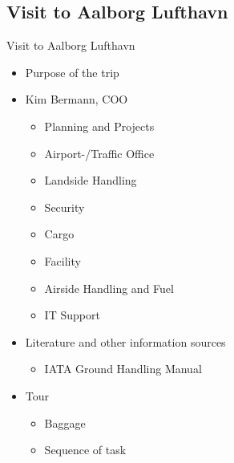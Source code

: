 \subsection{Visit to Aalborg Lufthavn}
\begin{frame}{Visit to Aalborg Lufthavn}{}
	\begin{itemize}
\item Purpose of the trip
\item Kim Bermann, COO
\begin{itemize}
	\item Planning and Projects
	\item Airport-/Traffic Office
	\item Landside Handling
	\item Security
	\item Cargo
	\item Facility
	\item Airside Handling and Fuel
	\item IT Support
\end{itemize}
\item Literature and other information sources
\begin{itemize}
	\item IATA Ground Handling Manual
\end{itemize}
\item Tour
\begin{itemize}
	\item Baggage 
	\item Sequence of task
\end{itemize}
\end{itemize}
\end{frame}
